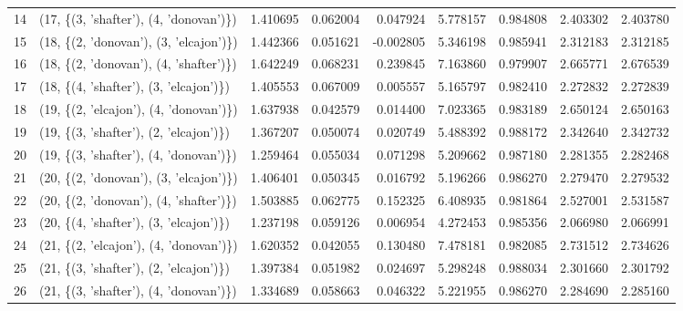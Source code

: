 \begin{tabular}{llrrrrrrr}
14 &  (17, \{(3, 'shafter'), (4, 'donovan')\}) &  1.410695 &  0.062004 &  0.047924 &  5.778157 &  0.984808 &  2.403302 &  2.403780 \\
15 &  (18, \{(2, 'donovan'), (3, 'elcajon')\}) &  1.442366 &  0.051621 & -0.002805 &  5.346198 &  0.985941 &  2.312183 &  2.312185 \\
16 &  (18, \{(2, 'donovan'), (4, 'shafter')\}) &  1.642249 &  0.068231 &  0.239845 &  7.163860 &  0.979907 &  2.665771 &  2.676539 \\
17 &  (18, \{(4, 'shafter'), (3, 'elcajon')\}) &  1.405553 &  0.067009 &  0.005557 &  5.165797 &  0.982410 &  2.272832 &  2.272839 \\
18 &  (19, \{(2, 'elcajon'), (4, 'donovan')\}) &  1.637938 &  0.042579 &  0.014400 &  7.023365 &  0.983189 &  2.650124 &  2.650163 \\
19 &  (19, \{(3, 'shafter'), (2, 'elcajon')\}) &  1.367207 &  0.050074 &  0.020749 &  5.488392 &  0.988172 &  2.342640 &  2.342732 \\
20 &  (19, \{(3, 'shafter'), (4, 'donovan')\}) &  1.259464 &  0.055034 &  0.071298 &  5.209662 &  0.987180 &  2.281355 &  2.282468 \\
21 &  (20, \{(2, 'donovan'), (3, 'elcajon')\}) &  1.406401 &  0.050345 &  0.016792 &  5.196266 &  0.986270 &  2.279470 &  2.279532 \\
22 &  (20, \{(2, 'donovan'), (4, 'shafter')\}) &  1.503885 &  0.062775 &  0.152325 &  6.408935 &  0.981864 &  2.527001 &  2.531587 \\
23 &  (20, \{(4, 'shafter'), (3, 'elcajon')\}) &  1.237198 &  0.059126 &  0.006954 &  4.272453 &  0.985356 &  2.066980 &  2.066991 \\
24 &  (21, \{(2, 'elcajon'), (4, 'donovan')\}) &  1.620352 &  0.042055 &  0.130480 &  7.478181 &  0.982085 &  2.731512 &  2.734626 \\
25 &  (21, \{(3, 'shafter'), (2, 'elcajon')\}) &  1.397384 &  0.051982 &  0.024697 &  5.298248 &  0.988034 &  2.301660 &  2.301792 \\
26 &  (21, \{(3, 'shafter'), (4, 'donovan')\}) &  1.334689 &  0.058663 &  0.046322 &  5.221955 &  0.986270 &  2.284690 &  2.285160 \\
\bottomrule
\end{tabular}
